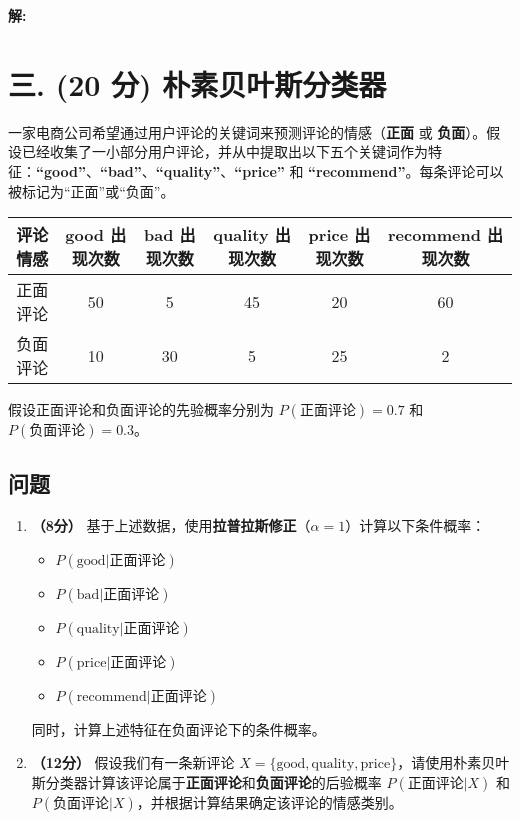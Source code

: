 \documentclass[8pt]{article}
\begin{document}
\textbf{\large 解:}

\vspace{3em}

\section*{三. (20 分) 朴素贝叶斯分类器}
一家电商公司希望通过用户评论的关键词来预测评论的情感（\textbf{正面} 或 \textbf{负面}）。假设已经收集了一小部分用户评论，并从中提取出以下五个关键词作为特征：\textbf{“good”}、\textbf{“bad”}、\textbf{“quality”}、\textbf{“price”} 和 \textbf{“recommend”}。每条评论可以被标记为“正面”或“负面”。

\begin{table}[h!]\small
    \centering
    \begin{tabular}{|c|c|c|c|c|c|}
        \hline
        评论情感 & good 出现次数 & bad 出现次数 & quality 出现次数 & price 出现次数 & recommend 出现次数 \\
        \hline
        正面评论 & 50 & 5 & 45 & 20 & 60 \\
        \hline
        负面评论 & 10 & 30 & 5 & 25 & 2 \\
        \hline
    \end{tabular}
\end{table}

假设正面评论和负面评论的先验概率分别为 \( P(\text{正面评论}) = 0.7 \) 和 \( P(\text{负面评论}) = 0.3 \)。

\subsection*{问题}

\begin{enumerate}
    \item \textbf{（8分）} 基于上述数据，使用\textbf{拉普拉斯修正}（\(\alpha = 1\)）计算以下条件概率：
        \begin{itemize}
            \item \( P(\text{good} | \text{正面评论}) \)
            \item \( P(\text{bad} | \text{正面评论}) \)
            \item \( P(\text{quality} | \text{正面评论}) \)
            \item \( P(\text{price} | \text{正面评论}) \)
            \item \( P(\text{recommend} | \text{正面评论}) \)
        \end{itemize}
    同时，计算上述特征在负面评论下的条件概率。

    \item \textbf{（12分）} 假设我们有一条新评论 \( X = \{\text{good}, \text{quality}, \text{price}\} \)，请使用朴素贝叶斯分类器计算该评论属于\textbf{正面评论}和\textbf{负面评论}的后验概率 \( P(\text{正面评论} | X) \) 和 \( P(\text{负面评论} | X) \)，并根据计算结果确定该评论的情感类别。
\end{enumerate}
\end{document}
